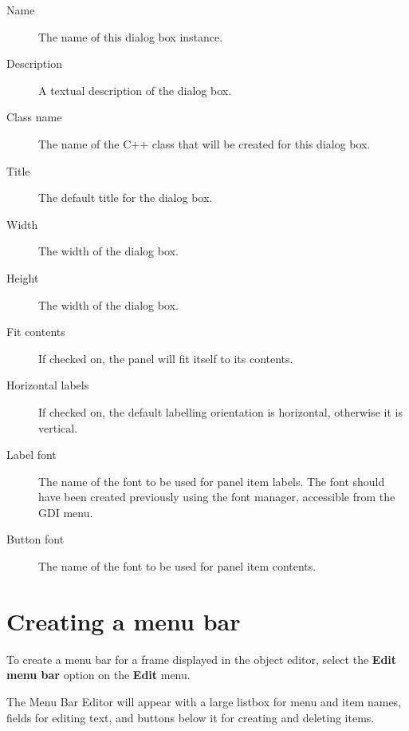 \begin{description}
\item[Name] The name of this dialog box instance.
\item[Description] A textual description of the dialog box.
\item[Class name] The name of the C++ class that will be created for
this dialog box.
\item[Title] The default title for the dialog box.
\item[Width] The width of the dialog box.
\item[Height] The width of the dialog box.
\item[Fit contents] If checked on, the panel will fit itself to its
contents.
\item[Horizontal labels] If checked on, the default labelling orientation
is horizontal, otherwise it is vertical.
\item[Label font] The name of the font to be used for panel item labels.
The font should have been created previously using the font manager,
accessible from the GDI menu.
\item[Button font] The name of the font to be used for panel item contents.
\end{description}

\section{Creating a menu bar}

To create a menu bar for a frame displayed in the object editor, select
the {\bf Edit menu bar} option on the {\bf Edit} menu. 

The Menu Bar Editor will appear with a large listbox for menu and item
names, fields for editing text, and buttons below it for creating
and deleting items.


